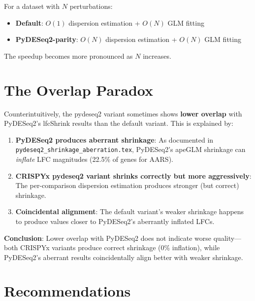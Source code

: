 \documentclass{article}
\begin{document}
For a dataset with $N$ perturbations:
\begin{itemize}
    \item \textbf{Default}: $O(1)$ dispersion estimation + $O(N)$ GLM fitting
    \item \textbf{PyDESeq2-parity}: $O(N)$ dispersion estimation + $O(N)$ GLM fitting
\end{itemize}

The speedup becomes more pronounced as $N$ increases.

\section{The Overlap Paradox}
\label{sec:paradox}

Counterintuitively, the pydeseq2 variant sometimes shows \textbf{lower overlap} with PyDESeq2's lfcShrink results than the default variant. This is explained by:

\begin{enumerate}
    \item \textbf{PyDESeq2 produces aberrant shrinkage}: As documented in \texttt{pydeseq2\_shrinkage\_aberration.tex}, PyDESeq2's apeGLM shrinkage can \emph{inflate} LFC magnitudes (22.5\% of genes for AARS).
    
    \item \textbf{CRISPYx pydeseq2 variant shrinks correctly but more aggressively}: The per-comparison dispersion estimation produces stronger (but correct) shrinkage.
    
    \item \textbf{Coincidental alignment}: The default variant's weaker shrinkage happens to produce values closer to PyDESeq2's aberrantly inflated LFCs.
\end{enumerate}

\textbf{Conclusion}: Lower overlap with PyDESeq2 does not indicate worse quality---both CRISPYx variants produce correct shrinkage (0\% inflation), while PyDESeq2's aberrant results coincidentally align better with weaker shrinkage.

\section{Recommendations}
\end{document}
